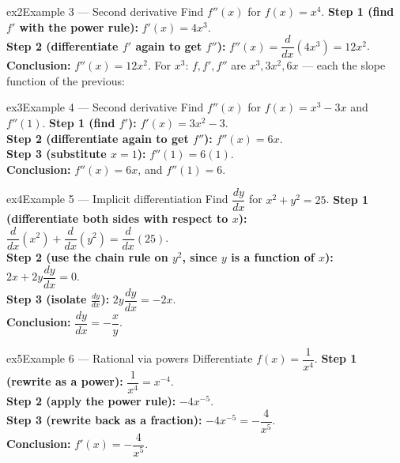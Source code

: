 \documentclass[11pt]{article}
\begin{document}
\begin{example}{ex2}{Example 3 --- Second derivative}
Find $f''(x)$ for $f(x)=x^4$.\soln
\textbf{Step 1 (find $f'$ with the power rule):} $f'(x)=4x^3$.\\[3pt]
\textbf{Step 2 (differentiate $f'$ again to get $f''$):} $f''(x)=\dfrac{d}{dx}(4x^3)=12x^2$.\\[3pt]
\textbf{Conclusion:} $f''(x)=12x^2$. For $x^3$: $f,f',f''$ are $x^3,3x^2,6x$ --- each the slope function of the previous:
\end{example}

\begin{example}{ex3}{Example 4 --- Second derivative}
Find $f''(x)$ for $f(x)=x^3-3x$ and $f''(1)$.\soln
\textbf{Step 1 (find $f'$):} $f'(x)=3x^2-3$.\\[3pt]
\textbf{Step 2 (differentiate again to get $f''$):} $f''(x)=6x$.\\[3pt]
\textbf{Step 3 (substitute $x=1$):} $f''(1)=6(1)$.\\[3pt]
\textbf{Conclusion:} $f''(x)=6x$, and $f''(1)=6$.
\end{example}

\begin{example}{ex4}{Example 5 --- Implicit differentiation}
Find $\dfrac{dy}{dx}$ for $x^2+y^2=25$.\soln
\textbf{Step 1 (differentiate both sides with respect to $x$):} $\dfrac{d}{dx}(x^2)+\dfrac{d}{dx}(y^2)=\dfrac{d}{dx}(25)$.\\[3pt]
\textbf{Step 2 (use the chain rule on $y^2$, since $y$ is a function of $x$):} $2x+2y\dfrac{dy}{dx}=0$.\\[3pt]
\textbf{Step 3 (isolate $\frac{dy}{dx}$):} $2y\dfrac{dy}{dx}=-2x$.\\[3pt]
\textbf{Conclusion:} $\dfrac{dy}{dx}=-\dfrac xy$.
\end{example}

\begin{example}{ex5}{Example 6 --- Rational via powers}
Differentiate $f(x)=\dfrac1{x^4}$.\soln
\textbf{Step 1 (rewrite as a power):} $\dfrac1{x^4}=x^{-4}$.\\[3pt]
\textbf{Step 2 (apply the power rule):} $-4x^{-5}$.\\[3pt]
\textbf{Step 3 (rewrite back as a fraction):} $-4x^{-5}=-\dfrac4{x^5}$.\\[3pt]
\textbf{Conclusion:} $f'(x)=-\dfrac4{x^5}$.
\end{example}
\end{document}
